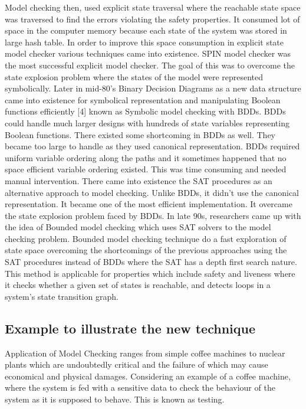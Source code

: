 \documentclass{article}
\begin{document}
Model checking then, used explicit state traversal where the reachable state space was traversed to find the errors violating the safety properties. It consumed lot of space in the computer memory because each state of the system was stored in large hash table. In order to improve this space consumption in explicit state model checker various techniques came into existence. SPIN model checker was the most successful explicit model checker. The goal of this was to overcome the state explosion problem where the states of the model were represented symbolically.
Later in mid-80’s Binary Decision Diagrams as a new data structure came into existence for symbolical representation and manipulating Boolean functions efficiently [4] known as Symbolic model checking with BDDs. BDDs could handle much larger designs with hundreds of state variables representing Boolean functions. There existed some shortcoming in BDDs as well. They became too large to handle as they used canonical representation. BDDs required uniform variable ordering along the paths and it sometimes happened that no space efficient variable ordering existed. This was time consuming and needed manual intervention.
There came into existence the SAT procedures as an alternative approach to model checking. Unlike BDDs, it didn’t use the canonical representation. It became one of the most efficient implementation. It overcame the state explosion problem faced by BDDs.
In late 90s, researchers came up with the idea of Bounded model checking which uses SAT solvers to the model checking problem. Bounded model checking technique do a fast exploration of state space overcoming the shortcomings of the previous approaches using the SAT procedures instead of BDDs where the SAT has a depth first search nature. This method is applicable for properties which include safety and liveness where it checks whether a given set of states is reachable, and detects loops in a system’s state transition graph.


\subsection{Example to illustrate the new technique}
\label{sec:exampleillust}

Application of Model Checking ranges from simple coffee machines to nuclear plants which are undoubtedly critical and the failure of which may cause economical and physical damages. Considering an example of a coffee machine, where the system is fed with a sensitive data to check the behaviour of the system as it is supposed to behave. This is known as testing.
\end{document}
